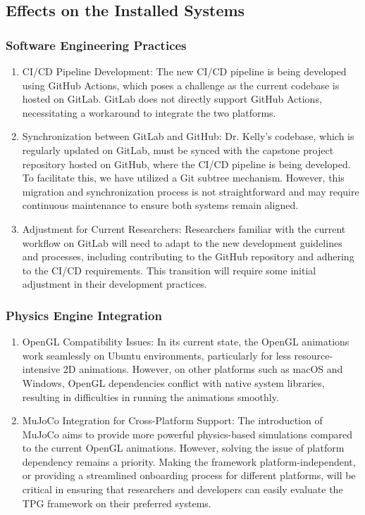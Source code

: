 \documentclass[12pt]{article}
\begin{document}
\subsection{Effects on the Installed Systems}

\subsubsection{Software Engineering Practices}

\begin{enumerate}
  \item CI/CD Pipeline Development: The new CI/CD pipeline is being developed using GitHub Actions, which poses a challenge as the current codebase is hosted on GitLab. GitLab does not directly support GitHub Actions, necessitating a workaround to integrate the two platforms.
  \item Synchronization between GitLab and GitHub: Dr. Kelly’s codebase, which is regularly updated on GitLab, must be synced with the capstone project repository hosted on GitHub, where the CI/CD pipeline is being developed. To facilitate this, we have utilized a Git subtree mechanism. However, this migration and synchronization process is not straightforward and may require continuous maintenance to ensure both systems remain aligned.
  \item Adjustment for Current Researchers: Researchers familiar with the current workflow on GitLab will need to adapt to the new development guidelines and processes, including contributing to the GitHub repository and adhering to the CI/CD requirements. This transition will require some initial adjustment in their development practices.
\end{enumerate}

\subsubsection{Physics Engine Integration}
\begin{enumerate}
  \item OpenGL Compatibility Issues: In its current state, the OpenGL animations work seamlessly on Ubuntu environments, particularly for less resource-intensive 2D animations. However, on other platforms such as macOS and Windows, OpenGL dependencies conflict with native system libraries, resulting in difficulties in running the animations smoothly.
  \item MuJoCo Integration for Cross-Platform Support: The introduction of MuJoCo aims to provide more powerful physics-based simulations compared to the current OpenGL animations. However, solving the issue of platform dependency remains a priority. Making the framework platform-independent, or providing a streamlined onboarding process for different platforms, will be critical in ensuring that researchers and developers can easily evaluate the TPG framework on their preferred systems.
\end{enumerate}
\end{document}
